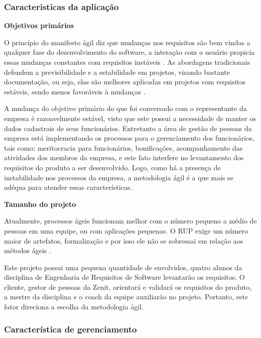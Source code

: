 \subsubsection{Caracteristicas da aplicação}
\begin{description}
\item \textbf{Objetivos primários}

O princípio do manifesto ágil diz que mudanças nos requisitos são bem vindas a qualquer fase do desenvolvimento do software, a interação com o usuário propicia essas mudanças constantes com requisitos instáveis \cite{agileManifest}. As abordagens tradicionais defendem a previsibilidade e a estabilidade em projetos, visando bastante documentação, ou seja, elas são melhores aplicadas em projetos com requisitos estáveis, sendo menos favoráveis à mudanças  \cite{boehm2004}.

A mudança do objetivo primário do que foi conversado com o representante da empresa é razoavelmente estável, visto que este possui a necessidade de manter os dados cadastrais de seus funcionários. Entretanto a área de gestão de pessoas da empresa está implementando os processos para o gerenciamento dos funcionários, tais como: meritocracia para funcionários, bonificações, acompanhamento das atividades dos membros da empresa, e este fato interfere no levantamento dos requisitos do produto a ser desenvolvido. Logo, como há a presença de instabilidade nos processos da empresa, a metodologia ágil é a que mais se adéqua para atender essas características.

\item \textbf{Tamanho do projeto}

Atualmente, processos ágeis funcionam melhor com o número pequeno a médio de pessoas em uma equipe, ou com aplicações pequenas. O RUP exige um número maior de artefatos, formalização e por isso ele não se sobressai em relação aos métodos ágeis \cite{boehm2004}.

Este projeto possui uma pequena quantidade de envolvidos, quatro alunos da disciplina de Engenharia de Requisitos de Software levantarão os requisitos. O cliente, gestor de pessoas da Zenit, orientará e validará os requisitos do produto, a mestre da disciplina e o coach da equipe auxiliarão no projeto. Portanto, este fator direciona a escolha da metodologia ágil.
\end{description}
\subsubsection{Característica de gerenciamento}

